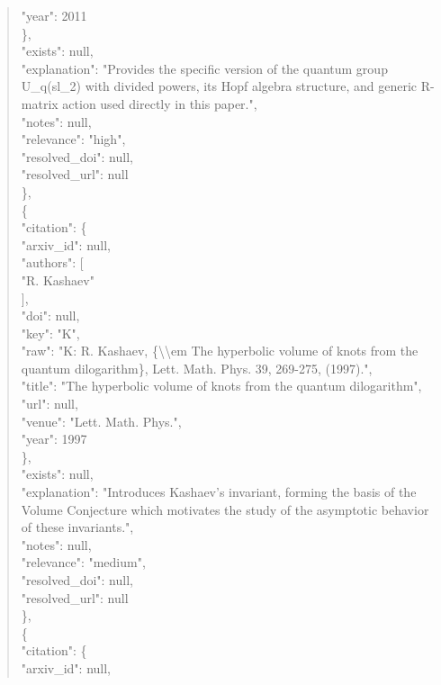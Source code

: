 \documentclass[11pt]{article}
\begin{document}
\begin{quote}
        "year": 2011\\
      \},\\
      "exists": null,\\
      "explanation": "Provides the specific version of the quantum group U\_q(sl\_2) with divided powers, its Hopf algebra structure, and generic R-matrix action used directly in this paper.",\\
      "notes": null,\\
      "relevance": "high",\\
      "resolved\_doi": null,\\
      "resolved\_url": null\\
    \},\\
    \{\\
      "citation": \{\\
        "arxiv\_id": null,\\
        "authors": [\\
          "R. Kashaev"\\
        ],\\
        "doi": null,\\
        "key": "K",\\
        "raw": "K: R. Kashaev, \{\textbackslash{}\textbackslash{}em The hyperbolic volume of knots from the quantum dilogarithm\}, Lett. Math. Phys. 39, 269-275, (1997).",\\
        "title": "The hyperbolic volume of knots from the quantum dilogarithm",\\
        "url": null,\\
        "venue": "Lett. Math. Phys.",\\
        "year": 1997\\
      \},\\
      "exists": null,\\
      "explanation": "Introduces Kashaev's invariant, forming the basis of the Volume Conjecture which motivates the study of the asymptotic behavior of these invariants.",\\
      "notes": null,\\
      "relevance": "medium",\\
      "resolved\_doi": null,\\
      "resolved\_url": null\\
    \},\\
    \{\\
      "citation": \{\\
        "arxiv\_id": null,\\

\end{quote}
\end{document}
